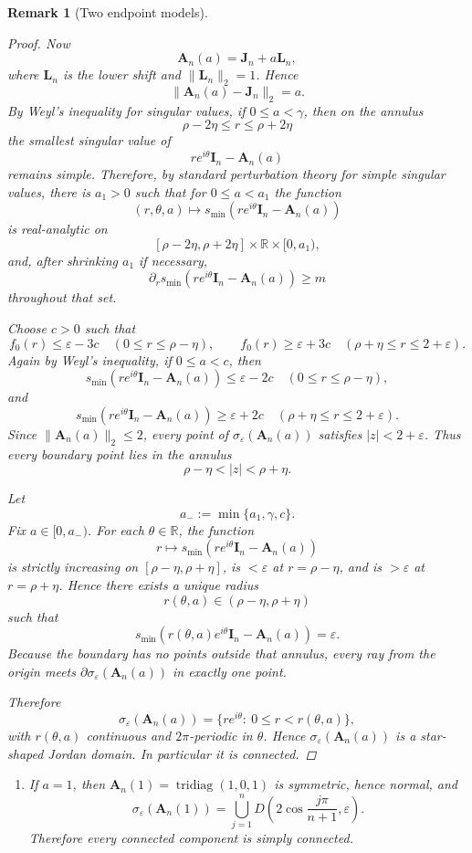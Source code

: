\documentclass[11pt]{article}
\newtheorem{remark}[theorem]{Remark}
\DeclareMathOperator{\tridiag}{tridiag}
\newcommand{\R}{\mathbb{R}}
\begin{document}
\begin{remark}[Two endpoint models]
\begin{proof}
Now
\[
\mathbf A_n(a)=\mathbf J_n+a\mathbf L_n,
\]
where \(\mathbf L_n\) is the lower shift and \(\|\mathbf L_n\|_2=1\). Hence
\[
\|\mathbf A_n(a)-\mathbf J_n\|_2=a.
\]
By Weyl's inequality for singular values, if \(0\le a<\gamma\), then on the annulus
\[
\rho-2\eta\le r\le \rho+2\eta
\]
the smallest singular value of
\[
re^{i\theta}\mathbf I_n-\mathbf A_n(a)
\]
remains simple. Therefore, by standard perturbation theory for simple singular values, there is \(a_1>0\) such that for \(0\le a<a_1\) the function
\[
(r,\theta,a)\longmapsto s_{\min}(re^{i\theta}\mathbf I_n-\mathbf A_n(a))
\]
is real-analytic on
\[
[\rho-2\eta,\rho+2\eta]\times \R \times [0,a_1),
\]
and, after shrinking \(a_1\) if necessary,
\[
\partial_r s_{\min}(re^{i\theta}\mathbf I_n-\mathbf A_n(a))\ge m
\]
throughout that set.

Choose \(c>0\) such that
\[
f_0(r)\le \varepsilon-3c
\quad (0\le r\le \rho-\eta),
\qquad
f_0(r)\ge \varepsilon+3c
\quad (\rho+\eta\le r\le 2+\varepsilon).
\]
Again by Weyl's inequality, if \(0\le a<c\), then
\[
s_{\min}(re^{i\theta}\mathbf I_n-\mathbf A_n(a))\le \varepsilon-2c
\quad (0\le r\le \rho-\eta),
\]
and
\[
s_{\min}(re^{i\theta}\mathbf I_n-\mathbf A_n(a))\ge \varepsilon+2c
\quad (\rho+\eta\le r\le 2+\varepsilon).
\]
Since \(\|\mathbf A_n(a)\|_2\le 2\), every point of \(\sigma_\varepsilon(\mathbf A_n(a))\) satisfies \(|z|<2+\varepsilon\). Thus every boundary point lies in the annulus
\[
\rho-\eta<|z|<\rho+\eta.
\]

Let
\[
a_-:=\min\{a_1,\gamma,c\}.
\]
Fix \(a\in[0,a_-)\). For each \(\theta\in\R\), the function
\[
r\longmapsto s_{\min}(re^{i\theta}\mathbf I_n-\mathbf A_n(a))
\]
is strictly increasing on \([\rho-\eta,\rho+\eta]\), is \(<\varepsilon\) at \(r=\rho-\eta\), and is \(>\varepsilon\) at \(r=\rho+\eta\). Hence there exists a unique radius
\[
r(\theta,a)\in(\rho-\eta,\rho+\eta)
\]
such that
\[
s_{\min}(r(\theta,a)e^{i\theta}\mathbf I_n-\mathbf A_n(a))=\varepsilon.
\]
Because the boundary has no points outside that annulus, every ray from the origin meets
\(\partial\sigma_\varepsilon(\mathbf A_n(a))\) in exactly one point.

Therefore
\[
\sigma_\varepsilon(\mathbf A_n(a))
=
\{re^{i\theta}:\ 0\le r<r(\theta,a)\},
\]
with \(r(\theta,a)\) continuous and \(2\pi\)-periodic in \(\theta\). Hence
\(\sigma_\varepsilon(\mathbf A_n(a))\) is a star-shaped Jordan domain. In particular it is connected.
\end{proof}

\begin{enumerate}
\item If \(a=1\), then \(\mathbf A_n(1)=\tridiag(1,0,1)\) is symmetric, hence normal, and
\[
\sigma_\varepsilon(\mathbf A_n(1))
=
\bigcup_{j=1}^n
D\!\left(2\cos\frac{j\pi}{n+1},\varepsilon\right).
\]
Therefore every connected component is simply connected.


\end{enumerate}
\end{remark}
\end{document}
